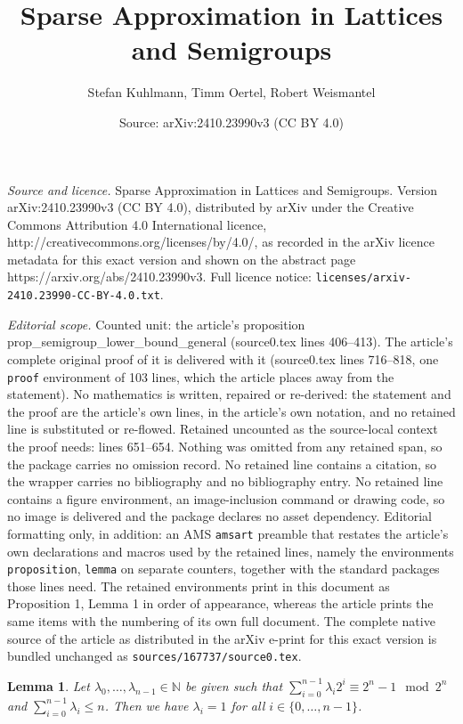 \documentclass[10pt,a4paper]{amsart}
\title{Sparse Approximation in Lattices and Semigroups}
\author{Stefan Kuhlmann, Timm Oertel, Robert Weismantel}
\date{Source: arXiv:2410.23990v3 (CC BY 4.0)}
\newtheorem{lemma}{Lemma}
\newcommand{\N}{\mathbb{N}}
\begin{document}
\maketitle

\noindent\emph{Source and licence.} Sparse Approximation in Lattices and Semigroups. Version arXiv:2410.23990v3 (CC BY 4.0), distributed by arXiv under the Creative Commons Attribution 4.0 International licence, http://creativecommons.org/licenses/by/4.0/, as recorded in the arXiv licence metadata for this exact version and shown on the abstract page https://arxiv.org/abs/2410.23990v3. Full licence notice: \texttt{licenses/arxiv-2410.23990-CC-BY-4.0.txt}.\par\smallskip

\noindent\textit{Editorial scope.} Counted unit: the article's proposition prop\_semigroup\_lower\_bound\_general (source0.tex lines 406--413). The article's complete original proof of it is delivered with it (source0.tex lines 716--818, one \texttt{proof} environment of 103 lines, which the article places away from the statement). No mathematics is written, repaired or re-derived: the statement and the proof are the article's own lines, in the article's own notation, and no retained line is substituted or re-flowed.  Retained uncounted as the source-local context the proof needs: lines 651--654.  Nothing was omitted from any retained span, so the package carries no omission record.  No retained line contains a citation, so the wrapper carries no bibliography and no bibliography entry.  No retained line contains a figure environment, an image-inclusion command or drawing code, so no image is delivered and the package declares no asset dependency.  Editorial formatting only, in addition: an AMS \texttt{amsart} preamble that restates the article's own declarations and macros used by the retained lines, namely the environments \texttt{proposition}, \texttt{lemma} on separate counters, together with the standard packages those lines need.  The retained environments print in this document as Proposition 1, Lemma 1 in order of appearance, whereas the article prints the same items with the numbering of its own full document.  The complete native source of the article as distributed in the arXiv e-print for this exact version is bundled unchanged as \texttt{sources/167737/source0.tex}.
	\begin{lemma}
		\label{lemma_semigroup_lower_bound}
		Let $\lambda_0,\ldots,\lambda_{n-1}\in\N$ be given such that $\sum_{i=0}^{n-1}\lambda_i2^i \equiv 2^n - 1 \mod 2^n$ and $\sum_{i=0}^{n-1}\lambda_i \leq n$. Then we have $\lambda_i = 1$ for all $i\in\lbrace 0,\ldots,n-1\rbrace$.
	\end{lemma}
\end{document}
